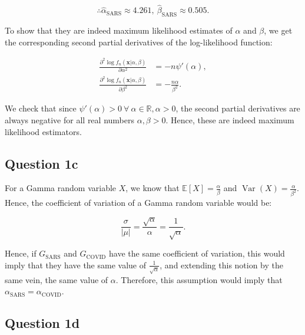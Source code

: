 \documentclass[11pt,fancychapters]{article}
\begin{document}
\begin{tcolorbox}
\begin{equation}\label{eqn1b9}
    \therefore \widehat{\alpha}_\text{SARS} \approx 4.261, ~
    \widehat{\beta}_\text{SARS} \approx 0.505.
\end{equation}
\end{tcolorbox}

To show that they are indeed maximum likelihood estimates of $\alpha$ and $\beta$, we get the corresponding second partial derivatives of the log-likelihood function:

\begin{equation}\label{eqn1b10}
\begin{split}
    \frac{\partial^2 \log{f_n(\boldsymbol{x}|\alpha, \beta)}}{\partial \alpha^2} & = -n \psi'(\alpha), \\
    \frac{\partial^2 \log{f_n(\boldsymbol{x}|\alpha, \beta)}}{\partial \beta^2} & = - \frac{n \alpha}{\beta^2}.
\end{split}
\end{equation}

We check that since $\psi'(\alpha) > 0 ~ \forall ~ \alpha \in \mathbb{R}, \alpha > 0$, the second partial derivatives are always negative for all real numbers $\alpha, \beta > 0$. Hence, these are indeed maximum likelihood estimators.

\subsection*{Question 1c}

For a Gamma random variable $X$, we know that $\mathbb{E}[X] = \frac{\alpha}{\beta}$ and $\operatorname{Var}(X) = \frac{\alpha}{\beta^2}$. Hence, the coefficient of variation of a Gamma random variable would be:

\begin{equation}\label{eqn1c1}
    \frac{\sigma}{\left| \mu \right|} = \frac{\sqrt{\alpha}}{\alpha} = \frac{1}{\sqrt{\alpha}}.
\end{equation}

Hence, if $G_\text{SARS}$ and $G_\text{COVID}$ have the same coefficient of variation, this would imply that they have the same value of $\frac{1}{\sqrt{\alpha}}$, and extending this notion by the same vein, the same value of $\alpha$. Therefore, this assumption would imply that $\alpha_\text{SARS} = \alpha_\text{COVID}$.

\subsection*{Question 1d}
\end{document}
